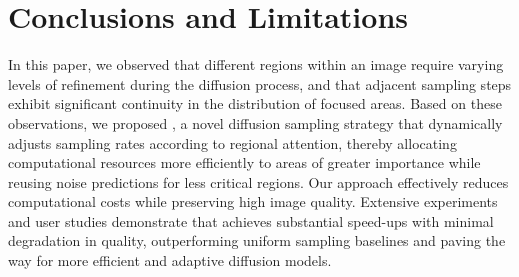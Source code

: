\section{Conclusions and Limitations}
\label{sec.conclusion}
In this paper, we observed that different regions within an image require varying levels of refinement during the diffusion process, and that adjacent sampling steps exhibit significant continuity in the distribution of focused areas. Based on these observations, we proposed \ourmethod{}, a novel diffusion sampling strategy that dynamically adjusts sampling rates according to regional attention, thereby allocating computational resources more efficiently to areas of greater importance while reusing noise predictions for less critical regions. Our approach effectively reduces computational costs while preserving high image quality. Extensive experiments and user studies demonstrate that \ourmethod{} achieves substantial speed-ups with minimal degradation in quality, outperforming uniform sampling baselines and paving the way for more efficient and adaptive diffusion models.


